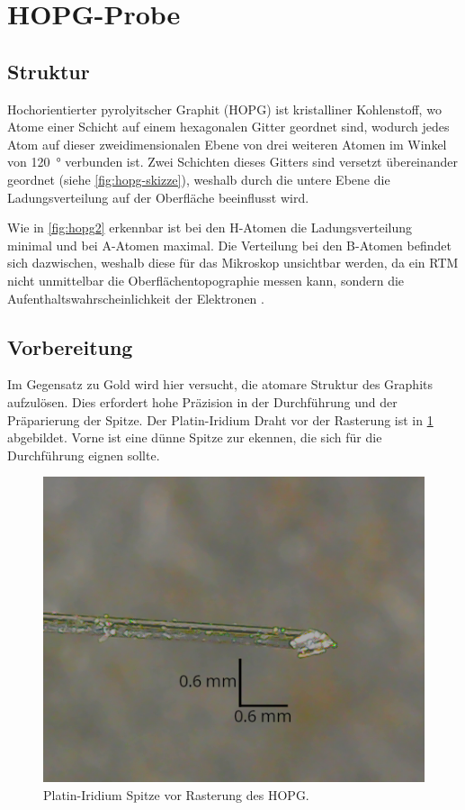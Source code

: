 \section{HOPG-Probe}\label{sec:hopg-probe}
\subsection*{Struktur}
Hochorientierter pyrolyitscher Graphit (HOPG) ist kristalliner Kohlenstoff, wo Atome einer Schicht
auf einem hexagonalen Gitter geordnet sind, wodurch jedes Atom auf dieser zweidimensionalen
Ebene von drei weiteren Atomen im Winkel von \SI{120}{\degree} verbunden ist. Zwei Schichten
dieses Gitters sind versetzt übereinander geordnet (siehe \cref{fig:hopg-skizze}), weshalb durch die
untere Ebene die Ladungsverteilung auf der Oberfläche beeinflusst wird.\par Wie in
\cref{fig:hopg2} erkennbar ist bei den H-Atomen die Ladungsverteilung minimal und bei A-Atomen maximal.
Die Verteilung bei den B-Atomen befindet sich dazwischen, weshalb diese für das Mikroskop unsichtbar werden,
da ein RTM nicht unmittelbar die Oberflächentopographie messen kann, sondern die Aufenthaltswahrscheinlichkeit der
Elektronen \cite[Kap.1 S.7]{rtm-leitpfaden}.



\subsection*{Vorbereitung}
Im Gegensatz zu Gold wird hier versucht, die atomare Struktur des Graphits aufzulösen.
Dies erfordert hohe Präzision in der Durchführung und der Präparierung der Spitze. Der Platin-Iridium Draht
vor der Rasterung ist in \cref{fig:spitze_hopg_vorher_v2} abgebildet. Vorne ist eine dünne Spitze zur ekennen,
die sich für die Durchführung eignen sollte.

\begin{figure}[htb]
	\centering
	\includegraphics[width=0.5\linewidth]{figs/spitze_hopg_vorher_v2.png}
	\caption{Platin-Iridium Spitze vor Rasterung des HOPG.}
	\label{fig:spitze_hopg_vorher_v2}
\end{figure}


